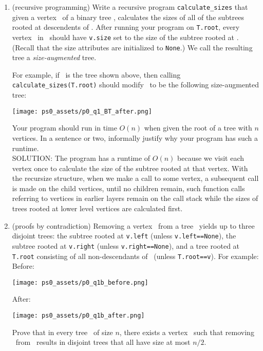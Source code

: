\documentclass[11pt]{article}
\begin{document}
\begin{enumerate}
 \begin{enumerate}
 \item \label{part:calculatesizes} (recursive programming)
 Write a recursive program \texttt{calculate\_sizes} that given a vertex \btv\ of a binary tree \treeT, calculates the sizes of all of the subtrees rooted at descendents of \btv.  After running your program on \texttt{T.root}, every vertex \btv\ in \treeT\ should have \texttt{v.size} set to the size of the subtree rooted at \btv. (Recall that the size attributes are initialized to \texttt{None}.)  We call the resulting tree a {\em size-augmented} tree.
 
For example, if \treeT\  is the  tree shown above, 
then calling \texttt{calculate\_sizes(T.root)} should modify  \treeT\ to be the following size-augmented tree:

 \texttt{[image: ps0\_assets/p0\_q1\_BT\_after.png]}

 Your program should run in time $O(n)$ when given the root of a tree with $n$ vertices. In a sentence or two, informally justify why your program has such a runtime. \\
 
 SOLUTION: The program has a runtime of $O(n)$ because we visit each vertex once to calculate the size of the subtree rooted at that vertex. With the recursize structure, when we make a call to some vertex, a subsequent call is made on the child vertices, until no children remain, such function calls referring to vertices in earlier layers remain on the call stack while the sizes of trees rooted at lower level vertices are calculated first. 
 
 \item (proofs by contradiction) \label{part:contradiction}
 Removing a vertex \btv\ from a tree \treeT\ yields up to three disjoint trees: the subtree rooted at
 \texttt{v.left} (unless \texttt{v.left==None}), the subtree rooted at
 \texttt{v.right} (unless \texttt{v.right==None}), and a tree rooted at \texttt{T.root} consisting of all non-descendants of \btv\ (unless \texttt{T.root==v}).  For example:
 \\

 Before:
 
 \texttt{[image: ps0\_assets/p0\_q1b\_before.png]}
 
 
 After:
 
  \texttt{[image: ps0\_assets/p0\_q1b\_after.png]}

  Prove that in every tree \treeT\ of size $n$, there exists a vertex \btv\ such that removing \btv\ from \treeT\ results in disjoint trees that all have size at most $n/2$.  \\
  

\end{enumerate}
\end{enumerate}
\end{document}

